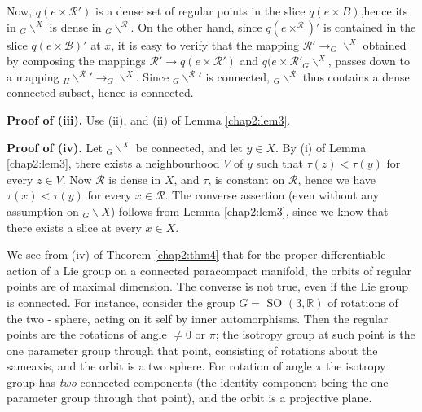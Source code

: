 Now, $q(e\times \mathcal{R}')$ is a dense  set of  regular
points in the slice $ q ( e  \times  B ) $,hence its in  $ _G
\backslash ^X  $  is  dense in  $ _G  \backslash  ^ \mathcal{R}
$. On the other hand, since $q ( e  \times^{\mathcal{R}})'$  is
contained in the slice  $ q ( e \times   \mathcal{B})'$ at $x$, it is  easy
to  verify that the mapping   $\mathcal{R}' \rightarrow _G
\backslash^X $   obtained by composing  the mappings  
$\mathcal{R}'  \rightarrow q ( e \times   \mathcal{R}' ) $ and  $ q (
e \times   \mathcal{R}' _G \backslash^X $, passes down to a mapping
$ _H \backslash^{\mathcal{R}}{'} \rightarrow _G \backslash ^X
$. Since   $ _G \backslash^ \mathcal{R}{'}$ is connected,   $_G
\backslash^ \mathcal{R} $  thus contains  a dense connected subset,
hence is connected. 

\medskip
\noindent \textbf{Proof of (iii).} 
  Use (ii), and  (ii)  of Lemma \ref{chap2:lem3}.

\medskip
\noindent \textbf{Proof of (iv).}  
  Let ${}_G \backslash^X $ be connected, and let $ y \in X $. By  (i)
  of Lemma \ref{chap2:lem3}, there exists a neighbourhood  $V$ of  $y$ such that 
  $ \tau (z) < \tau (y) $  for every  $ z \in V $. Now $ \mathcal{ R} $
  is  dense in  $ X $, and  $ \tau $, is constant on $  \mathcal{R} $,
  hence we have $ \tau (x)  <  \tau (y) $ for every  $ x \in
  \mathcal{R} $. The converse assertion  (even without  any assumption
  on  $_G \backslash X$) follows from Lemma \ref{chap2:lem3}, since we know that
  there exists a  slice  at every $x \in X$.

 \setcounter{rem}{0}
\begin{rem}%
  We see from (iv)  of  Theorem \ref{chap2:thm4} that for the proper
  differentiable action of  a Lie group on a connected paracompact
  manifold,  the orbits of regular points  are  of maximal
  dimension. The converse is  not true, even if the Lie  group is
  connected. For  instance, consider the  group  $ G = \text{  SO } (
  3, \mathbb{R})$ of  rotations of the two - sphere, acting on  it self
  by inner automorphisms. Then the regular points are the rotations of
  angle $ \neq 0 $ or $ \pi $; the  isotropy  group at such point is
  the one   parameter group through that point, consisting  of
  rotations about  the  same\pageoriginale axis, and the  orbit is a two
  sphere. For rotation of  angle $ \pi $ the isotropy group has
  \textit{two} connected components  (the identity component being the
  one  parameter group through that point), and  the orbit is a
  projective plane. 
\end{rem} 
 
